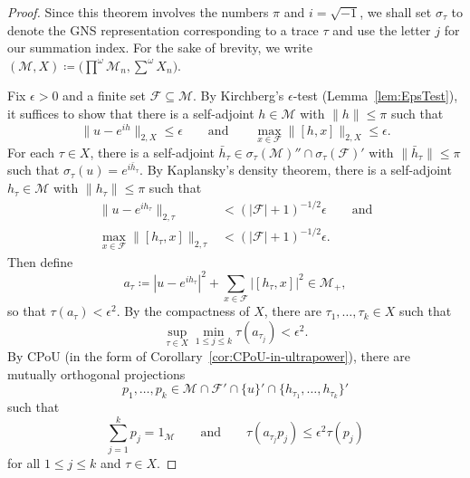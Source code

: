 \documentclass[a4paper,11pt]{amsart}
\theoremstyle{definition}
\numberwithin{equation}{section}
\numberwithin{theorem}{section}
\newcommand{\M}{\mathcal{M}}
\begin{document}
\begin{proof}
	Since this theorem involves the numbers $\pi$ and $i=\sqrt{-1}$, we shall set $\sigma_\tau$ to denote the GNS representation corresponding to a trace $\tau$ and use the letter $j$ for our summation index.
	For the sake of brevity, we write $(\M, X) \coloneqq \big(\prod^\omega \M_n, \sum^\omega X_n\big)$.
	
	
	Fix $\epsilon > 0$ and a finite set $\mathcal F \subseteq \M$. By Kirchberg's $\epsilon$-test (Lemma~\ref{lem:EpsTest}), it suffices to show that  there is a self-adjoint $h \in \M$ with $\|h\| \leq \pi$ such that
	\begin{equation}\label{eq:approx-polar-decomp}
		\|u - e^{ih}\|_{2, X} \leq \epsilon \qquad \text{and} \qquad \max_{x \in \mathcal F} \|[h, x]\|_{2, X} \leq \epsilon.
	\end{equation}
	For each $\tau \in X$, there is a self-adjoint $\bar h_\tau \in \sigma_\tau(\M)'' \cap \sigma_\tau(\mathcal F)'$ with $\|\bar h_\tau\| \leq \pi$ such that $\sigma_\tau(u) = e^{i\bar h_\tau}$.  By Kaplansky's density theorem, there is a self-adjoint $h_\tau \in \M$ with $\|h_\tau\| \leq \pi$ such that
	\begin{equation}
    \begin{split}
		\|u - e^{ih_\tau}\|_{2, \tau} &< (|\mathcal F| + 1)^{-1/2} \epsilon \qquad \text{and}\\ 
		\max_{x \in \mathcal F} \|[h_\tau, x]\|_{2, \tau} &< (|\mathcal F| + 1)^{-1/2} \epsilon.
	\end{split}
   \end{equation}
Then define
	\begin{equation}
		a_\tau \coloneqq |u - e^{ih_\tau}|^2 + \sum_{x \in \mathcal F} |[h_\tau, x]|^2 \in \M_+,
	\end{equation}
so that $\tau(a_\tau) < \epsilon^2$.  By the compactness of $X$, there are $\tau_1, \ldots, \tau_k \in X$ such that
	\begin{equation}
		\sup_{\tau \in X} \min_{1 \leq j \leq k} \tau(a_{\tau_j}) < \epsilon^2.
	\end{equation}
	By CPoU (in the form of Corollary~\ref{cor:CPoU-in-ultrapower}), there are  mutually orthogonal projections 
	\begin{equation}
		p_1, \ldots, p_k \in \M \cap \mathcal F' \cap \{u\}' \cap \{h_{\tau_1}, \ldots, h_{\tau_k}\}'
	\end{equation}
	such that
	\begin{equation}
		\sum_{j=1}^k p_j = 1_{\M} \qquad \text{and} \qquad \tau(a_{\tau_j} p_j)  \leq \epsilon^2 \tau(p_j)
	\end{equation}
	for all $1 \leq j \leq k$ and $\tau \in X$.
	

\end{proof}
\end{document}
